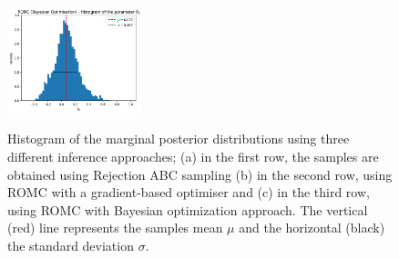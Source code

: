 \begin{figure}[h]
\begin{center}
      \includegraphics[width=0.35\textwidth]{./latex_files/images/chapter4/mae2_hist_t2_romc_bo.png}\\
    \end{center}
    \caption[MA2 example, evaluation of the marginal
    distributions.]{Histogram of the marginal posterior distributions
      using three different inference approaches; (a) in the first
      row, the samples are obtained using Rejection ABC sampling (b)
      in the second row, using ROMC with a gradient-based optimiser
      and (c) in the third row, using ROMC with Bayesian optimization
      approach. The vertical (red) line represents the samples mean
      $\mu$ and the horizontal (black) the standard deviation
      $\sigma$.}
  \label{fig:ma2_3}
\end{figure}



